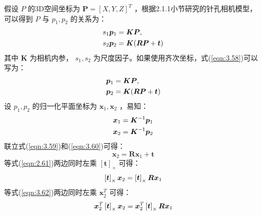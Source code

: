 假设 $P$ 的3D空间坐标为 $\boldsymbol{P}=[X, Y, Z]^{T} $ ，根据2.1.1小节研究的针孔相机模型，可以得到 $P$ 与 $p_1,p_2 $ 的关系为：
\begin{equation}
\label{eqn:3.58}
\setlength{\abovedisplayskip}{6pt}
\setlength{\belowdisplayskip}{6pt}
\begin{aligned}
s_{1} \boldsymbol{p}_{1} &= \boldsymbol{K} \boldsymbol{P},  \\
s_{2} \boldsymbol{p}_{2} &= \boldsymbol{K}(\boldsymbol{R} \boldsymbol{P}+\boldsymbol{t})
\end{aligned}
\end{equation}
其中 $\bm{K} $ 为相机内参， $s_1,s_2 $ 为尺度因子。如果使用齐次坐标，式(\ref{eqn:3.58})可以写为：
\begin{equation}
\label{eqn:3.59}
\setlength{\abovedisplayskip}{6pt}
\setlength{\belowdisplayskip}{6pt}
\begin{aligned}
\boldsymbol{p}_{1} &= \boldsymbol{K} \boldsymbol{P},  \\
\boldsymbol{p}_{2} &= \boldsymbol{K}(\boldsymbol{R} \boldsymbol{P}+\boldsymbol{t})
\end{aligned}
\end{equation}
设 $p_1,p_2 $ 的归一化平面坐标为 $\boldsymbol{x}_{1}, \boldsymbol{x}_{2} $ ，易知：
\begin{equation}
\label{eqn:3.60}
\setlength{\abovedisplayskip}{6pt}
\setlength{\belowdisplayskip}{6pt}
\begin{aligned}
\boldsymbol{x}_{1} &=\boldsymbol{K}^{-1} \boldsymbol{p}_{1} \\
\boldsymbol{x}_{2} &=\boldsymbol{K}^{-1} \boldsymbol{p}_{2}
\end{aligned}
\end{equation}
联立式(\ref{eqn:3.59})和(\ref{eqn:3.60})可得：
\begin{equation}
\label{eqn:3.61}
\boldsymbol{x}_{2}=\boldsymbol{R} \boldsymbol{x}_{1}+\boldsymbol{t}
\end{equation}
等式(\ref{eqn:2.61})两边同时左乘 $\left[\bm{t}\right]_\times $ 可得：
\begin{equation}
\label{eqn:3.62}
\setlength{\abovedisplayskip}{6pt}
\setlength{\belowdisplayskip}{6pt}
\left[\boldsymbol{t}\right]_\times \boldsymbol{x}_{2}= \left[\boldsymbol{t}\right]_\times  \boldsymbol{R} \boldsymbol{x}_{1}
\end{equation}
等式(\ref{eqn:3.62})两边同时左乘 $\bm{x}_{2}^{T} $ 可得：
\begin{equation}
\label{eqn:3.63}
\setlength{\abovedisplayskip}{6pt}
\setlength{\belowdisplayskip}{6pt}
\boldsymbol{x}_{2}^{T} \left[\boldsymbol{t}\right]_\times \boldsymbol{x}_{2}=
\boldsymbol{x}_{2}^{T} \left[\boldsymbol{t}\right]_\times \boldsymbol{R} \boldsymbol{x}_{1}
\end{equation}
